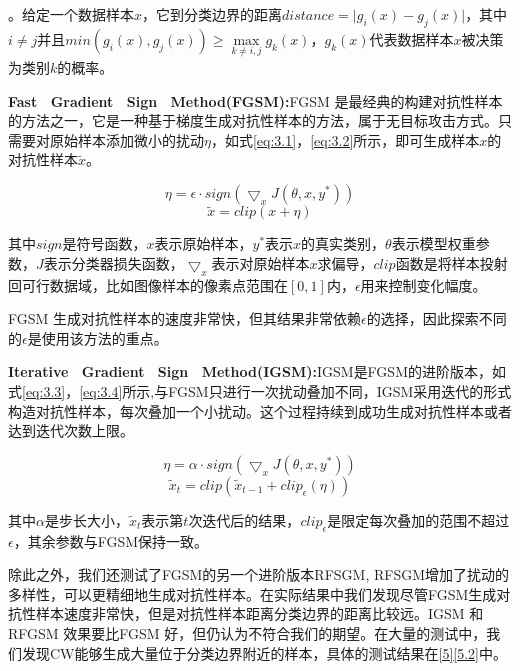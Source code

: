 \begin{myDef}
	\label{def:3}
	。给定一个数据样本$x$，它到分类边界的距离$distance = \vert g_i(x) - g_j(x) \vert$，其中$i \neq j $并且$min(g_i(x), g_j(x)) \geq \mathop{max} \limits_{k \neq i, j}g_k(x)$，$g_k(x)$代表数据样本$x$被决策为类别$k$的概率。
\end{myDef}

\noindent\textbf{Fast \ Gradient \ Sign \ Method(FGSM):}FGSM \cite{goodfellow2014explaining}是最经典的构建对抗性样本的方法之一，它是一种基于梯度生成对抗性样本的方法，属于无目标攻击方式。只需要对原始样本添加微小的扰动$\eta$，如式\ref{eq:3.1}，\ref{eq:3.2}所示，即可生成样本$x$的对抗性样本$\tilde{x}$。

\begin{equation}
	\label{eq:3.1}
	\eta = \epsilon \cdot sign(\bigtriangledown_xJ(\theta,x,y^*))
\end{equation}
\begin{equation}
	\label{eq:3.2}
	\tilde{x} = clip(x + \eta)
\end{equation}

\noindent 其中$sign$是符号函数，$x$表示原始样本，$y^*$表示$x$的真实类别，$\theta$表示模型权重参数，$J$表示分类器损失函数，$\bigtriangledown_x$表示对原始样本$x$求偏导，$clip$函数是将样本投射回可行数据域，比如图像样本的像素点范围在$[0,1]$内，$\epsilon$用来控制变化幅度。

FGSM 生成对抗性样本的速度非常快，但其结果非常依赖$\epsilon$的选择，因此探索不同的$\epsilon$是使用该方法的重点。

\noindent\textbf{Iterative \ Gradient \ Sign \ Method(IGSM):}IGSM\cite{kurakin2018adversarial}是FGSM的进阶版本，如式\ref{eq:3.3}，\ref{eq:3.4}所示,与FGSM只进行一次扰动叠加不同，IGSM采用迭代的形式构造对抗性样本，每次叠加一个小扰动。这个过程持续到成功生成对抗性样本或者达到迭代次数上限。

\begin{equation}
	\label{eq:3.3}
	\eta = \alpha \cdot sign(\bigtriangledown_xJ(\theta,x,y^*))
\end{equation}
\begin{equation}
	\label{eq:3.4}
	\tilde{x}_t = clip(\tilde{x}_{t - 1}  + clip_{\epsilon}(\eta))
\end{equation}

\noindent 其中$\alpha$是步长大小，$\tilde{x}_t$表示第$t$次迭代后的结果，$clip_{\epsilon}$是限定每次叠加的范围不超过$\epsilon$，其余参数与FGSM保持一致。

除此之外，我们还测试了FGSM的另一个进阶版本RFSGM\cite{tramer2017ensemble}, RFSGM增加了扰动的多样性，可以更精细地生成对抗性样本。在实际结果中我们发现尽管FGSM生成对抗性样本速度非常快，但是对抗性样本距离分类边界的距离比较远。IGSM 和RFGSM 效果要比FGSM 好，但仍认为不符合我们的期望。在大量的测试中，我们发现CW能够生成大量位于分类边界附近的样本，具体的测试结果在\ref{5}\ref{5.2}中。

